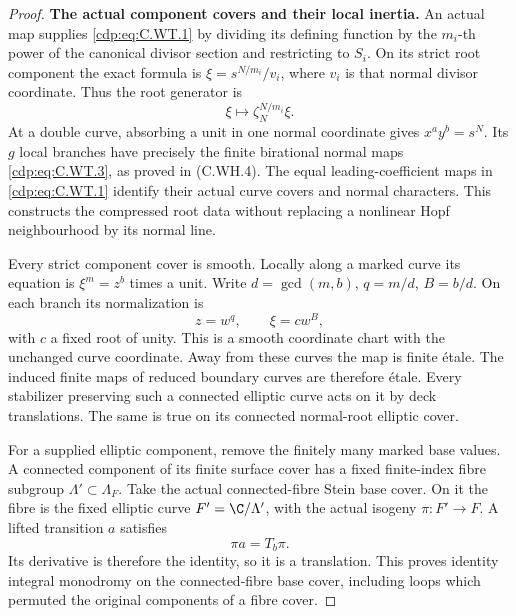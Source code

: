 \begin{proof}
\par\medskip\noindent\textbf{The actual component covers and their local inertia.}
An actual map supplies \eqref{cdp:eq:C.WT.1} by dividing its defining
function by the \(m_i\)-th power of the canonical divisor
section and restricting to \(S_i\). On its strict root
component the exact formula is
\(\xi=s^{N/m_i}/v_i\), where \(v_i\) is that normal
divisor coordinate. Thus the root generator is
\[
                  \xi\longmapsto
                         \zeta_N^{N/m_i}\xi.
 \tag{C.WT.6}\label{cdp:eq:C.WT.6}
\]
At a double curve, absorbing a unit in one normal
coordinate gives \(x^a y^b=s^N\). Its \(g\) local
branches have precisely the finite birational
normal maps \eqref{cdp:eq:C.WT.3}, as proved in (C.WH.4).
The equal leading-coefficient maps in \eqref{cdp:eq:C.WT.1}
identify their actual curve covers and normal
characters. This constructs the compressed root
data without replacing a nonlinear Hopf
neighbourhood by its normal line.

Every strict component cover is smooth. Locally along
a marked curve its equation is
\(\xi^m=z^b\) times a unit. Write
\(d=\gcd(m,b)\), \(q=m/d\), \(B=b/d\).
On each branch its normalization is
\[
                         z=w^q,\qquad \xi=cw^B,
 \tag{C.WT.7}\label{cdp:eq:C.WT.7}
\]
with \(c\) a fixed root of unity. This is a smooth
coordinate chart with the unchanged curve
coordinate. Away from these curves the map is
finite \'{e}tale. The induced finite maps of
reduced boundary curves are therefore \'{e}tale.
Every stabilizer preserving such a connected
elliptic curve acts on it by deck translations.
The same is true on its connected normal-root
elliptic cover.

For a supplied elliptic component, remove the finitely
many marked base values. A connected component of
its finite surface cover has a fixed finite-index
fibre subgroup \(\Lambda'\subset\Lambda_F\).
Take the actual connected-fibre Stein base cover.
On it the fibre is the fixed elliptic curve
\(F'=\C/\Lambda'\), with the actual isogeny
\(\pi:F'\to F\). A lifted transition \(a\)
satisfies
\[
                            \pi a=T_b\pi.
 \tag{C.WT.8}\label{cdp:eq:C.WT.8}
\]
Its derivative is therefore the identity, so it
is a translation. This proves identity integral
monodromy on the connected-fibre base cover,
including loops which permuted the original
components of a fibre cover.


\end{proof}
